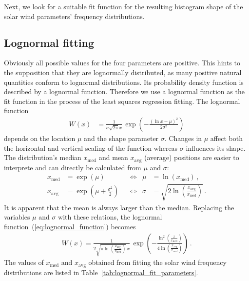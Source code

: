 Next, we look for a suitable fit function for the resulting histogram shape of the solar wind parameters' frequency distributions.

\subsection{Lognormal fitting}
Obviously all possible values for the four parameters are positive. This hints to the supposition that they are lognormally distributed, as many positive natural quantities conform to lognormal distributions. Its probability density function is described by a lognormal function.
Therefore we use a lognormal function as the fit function in the process of the least squares regression fitting.
The lognormal function
\begin{align}
	W(x) &= \frac{1}{\sigma \sqrt{2 \pi} x} \, \exp\left(- \frac{\left(\ln x - \mu\right)^2}{2 \sigma^2}\right)	\label{eq:lognormal_function}
\end{align}
depends on the location $\mu$ and the shape parameter $\sigma$. Changes in $\mu$ affect both the horizontal and vertical scaling of the function whereas $\sigma$ influences its shape. The distribution's median $x_\text{med}$ and mean $x_\text{avg}$ (average) positions are easier to interprete and can directly be calculated from $\mu$ and $\sigma$:
\begin{align}
	x_\text{med} &= \exp\left(\mu\right)	&	&\Longleftrightarrow	&	\mu &= \ln\left(x_\text{med}\right)\,,	\label{eq:lognormal_median}\\
	x_\text{avg} &= \exp\left(\mu + \frac{\sigma^2}{2}\right)	&	&\Longleftrightarrow	&	\sigma &= \sqrt{2 \ln\left(\frac{x_\text{avg}}{x_\text{med}}\right)}\,.	\label{eq:lognormal_mean}
\end{align}
It is apparent that the mean is always larger than the median. Replacing the variables $\mu$ and $\sigma$ with these relations, the lognormal function~(\ref{eq:lognormal_function}) becomes
\begin{align}
	W(x) = \frac{1}{2 \sqrt{\pi \ln\left(\frac{x_\text{avg}}{x_\text{med}}\right)} \, x} \, \exp\left(- \frac{\ln^2\left(\frac{x}{x_\text{med}}\right)}{4 \ln\left(\frac{x_\text{avg}}{x_\text{med}}\right)}\right)\,.	\label{eq:single_lognormal_fit_function}
\end{align}
The values of $x_\text{med}$ and $x_\text{avg}$ obtained from fitting the solar wind frequency distributions are listed in Table~\ref{tab:lognormal_fit_parameters}.
